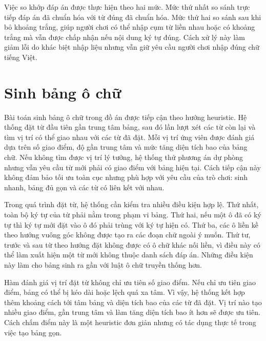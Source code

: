 \documentclass[../DoAn.tex]{subfiles}
\begin{document}
Việc so khớp đáp án được thực hiện theo hai mức. Mức thứ nhất so sánh trực tiếp đáp án đã chuẩn hóa với từ đúng đã chuẩn hóa. Mức thứ hai so sánh sau khi bỏ khoảng trắng, giúp người chơi có thể nhập cụm từ liền nhau hoặc có khoảng trắng mà vẫn được chấp nhận nếu nội dung ký tự đúng. Cách xử lý này làm giảm lỗi do khác biệt nhập liệu nhưng vẫn giữ yêu cầu người chơi nhập đúng chữ tiếng Việt.


\section{Sinh bảng ô chữ}
Bài toán sinh bảng ô chữ trong đồ án được tiếp cận theo hướng heuristic. Hệ thống đặt từ đầu tiên gần trung tâm bảng, sau đó lần lượt xét các từ còn lại và tìm vị trí có thể giao nhau với các từ đã đặt. Mỗi vị trí ứng viên được đánh giá dựa trên số giao điểm, độ gần trung tâm và mức tăng diện tích bao của bảng chữ. Nếu không tìm được vị trí lý tưởng, hệ thống thử phương án dự phòng nhưng vẫn yêu cầu từ mới phải có giao điểm với bảng hiện tại. Cách tiếp cận này không đảm bảo tối ưu toàn cục nhưng phù hợp với yêu cầu của trò chơi: sinh nhanh, bảng đủ gọn và các từ có liên kết với nhau.

Trong quá trình đặt từ, hệ thống cần kiểm tra nhiều điều kiện hợp lệ. Thứ nhất, toàn bộ ký tự của từ phải nằm trong phạm vi bảng. Thứ hai, nếu một ô đã có ký tự thì ký tự mới đặt vào ô đó phải trùng với ký tự hiện có. Thứ ba, các ô liền kề theo hướng vuông góc không được tạo ra các đoạn chữ ngoài ý muốn. Thứ tư, trước và sau từ theo hướng đặt không được có ô chữ khác nối liền, vì điều này có thể làm xuất hiện một từ mới không thuộc danh sách đáp án. Những điều kiện này làm cho bảng sinh ra gần với luật ô chữ truyền thống hơn.

Hàm đánh giá vị trí đặt từ không chỉ ưu tiên số giao điểm. Nếu chỉ ưu tiên giao điểm, bảng có thể bị kéo dài hoặc lệch quá xa tâm. Vì vậy, hệ thống kết hợp thêm khoảng cách tới tâm bảng và diện tích bao của các từ đã đặt. Vị trí nào tạo nhiều giao điểm, gần trung tâm và làm tăng diện tích bao ít hơn sẽ được ưu tiên. Cách chấm điểm này là một heuristic đơn giản nhưng có tác dụng thực tế trong việc tạo bảng gọn.

\end{document}
